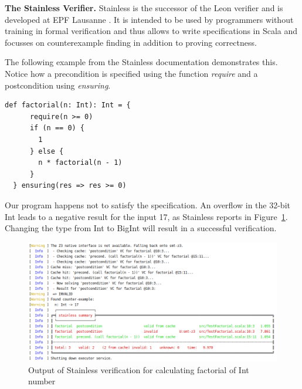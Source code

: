 \documentclass[runningheads]{llncs}
\renewcommand{\paragraph}{\textbf}%
\begin{document}
\paragraph{The Stainless Verifier.} Stainless is the successor of the
Leon verifier
\cite{DBLP:conf/ecoop/BlancKKS13,DBLP:conf/pldi/VoirolKK15,DBLP:conf/pldi/BlancK15}
and is developed at EPF Lausanne
\cite{Stainless:github}. It is intended to be
used by programmers without training in formal verification and thus
allows to write specifications in Scala and focusses on counterexample
finding in addition to proving correctness.

The following example from the Stainless documentation
\cite{Stainless:documentation} demonstrates this. Notice how a
precondition is specified using the function \emph{require} and a
postcondition using \emph{ensuring}.

\begin{lstlisting}[style=scala]
  def factorial(n: Int): Int = {
      require(n >= 0)
      if (n == 0) {
        1
      } else {
        n * factorial(n - 1)
      }
  } ensuring(res => res >= 0)
\end{lstlisting}

Our program happens not to satisfy the specification. An overflow in
the 32-bit Int leads to a negative result for the input 17, as
Stainless reports in Figure~\ref{fig:failed}. Changing the type from
Int to BigInt will result in a successful verification.

\begin{figure}
	\centering
		\includegraphics[width=\textwidth]{output1.png}
	\caption{Output of Stainless verification for calculating factorial of Int number}
	\label{fig:failed}
\end{figure}
\end{document}
